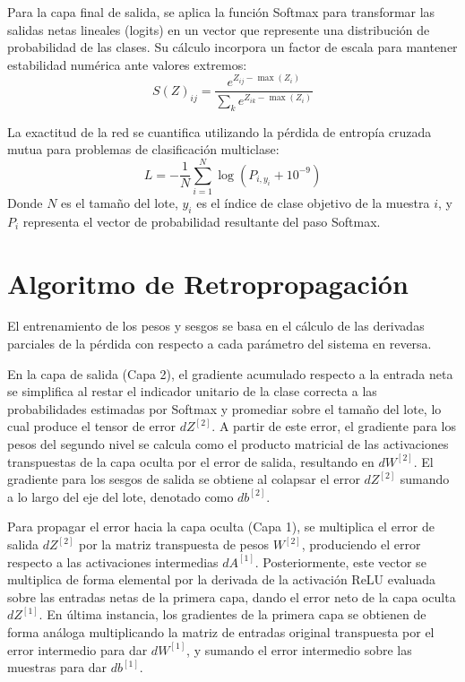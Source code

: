 \documentclass[11pt,a4paper]{article}
\begin{document}
Para la capa final de salida, se aplica la función Softmax para transformar las salidas netas lineales (logits) en un vector que represente una distribución de probabilidad de las clases. Su cálculo incorpora un factor de escala para mantener estabilidad numérica ante valores extremos:
\begin{equation}
    S(Z)_{ij} = \frac{e^{Z_{ij} - \max(Z_{i})}}{\sum_{k} e^{Z_{ik} - \max(Z_{i})}}
\end{equation}

La exactitud de la red se cuantifica utilizando la pérdida de entropía cruzada mutua para problemas de clasificación multiclase:
\begin{equation}
    L = -\frac{1}{N} \sum_{i=1}^{N} \log(P_{i, y_i} + 10^{-9})
\end{equation}
Donde $N$ es el tamaño del lote, $y_i$ es el índice de clase objetivo de la muestra $i$, y $P_i$ representa el vector de probabilidad resultante del paso Softmax.

\section*{Algoritmo de Retropropagación}
El entrenamiento de los pesos y sesgos se basa en el cálculo de las derivadas parciales de la pérdida con respecto a cada parámetro del sistema en reversa. 

En la capa de salida (Capa 2), el gradiente acumulado respecto a la entrada neta se simplifica al restar el indicador unitario de la clase correcta a las probabilidades estimadas por Softmax y promediar sobre el tamaño del lote, lo cual produce el tensor de error $dZ^{[2]}$. A partir de este error, el gradiente para los pesos del segundo nivel se calcula como el producto matricial de las activaciones transpuestas de la capa oculta por el error de salida, resultando en $dW^{[2]}$. El gradiente para los sesgos de salida se obtiene al colapsar el error $dZ^{[2]}$ sumando a lo largo del eje del lote, denotado como $db^{[2]}$.

Para propagar el error hacia la capa oculta (Capa 1), se multiplica el error de salida $dZ^{[2]}$ por la matriz transpuesta de pesos $W^{[2]}$, produciendo el error respecto a las activaciones intermedias $dA^{[1]}$. Posteriormente, este vector se multiplica de forma elemental por la derivada de la activación ReLU evaluada sobre las entradas netas de la primera capa, dando el error neto de la capa oculta $dZ^{[1]}$. En última instancia, los gradientes de la primera capa se obtienen de forma análoga multiplicando la matriz de entradas original transpuesta por el error intermedio para dar $dW^{[1]}$, y sumando el error intermedio sobre las muestras para dar $db^{[1]}$.
\end{document}
